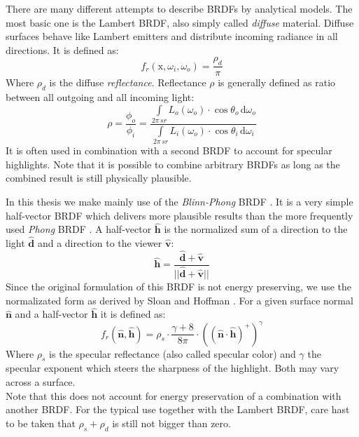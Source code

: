 \documentclass[thesis.tex]{subfiles}
\begin{document}
There are many different attempts to describe BRDFs by analytical models.
The most basic one is the Lambert BRDF, also simply called \emph{diffuse} material.
Diffuse surfaces behave like Lambert emitters and distribute incoming radiance in all directions.
It is defined as:
\begin{equation}
f_r(\mathrm{x}, \omega_i, \omega_o) = \frac{\rho_d}{\pi}
\end{equation}
Where $\rho_d$ is the diffuse \emph{reflectance}.
Reflectance $\rho$ is generally defined as ratio between all outgoing and all incoming light:
\begin{equation}
\rho = \frac{\phi_o}{\phi_i} = \frac{\int\limits_{2\pi\,sr} L_o(\omega_o)\cdot \cos\theta_o  \, \mathrm{d}\omega_o}{\int\limits_{2\pi\,sr} L_i(\omega_o)\cdot \cos\theta_i  \, \mathrm{d}\omega_i}
\end{equation}
It is often used in combination with a second BRDF to account for specular highlights.
Note that it is possible to combine arbitrary BRDFs as long as the combined result is still physically plausible.

In this thesis we make mainly use of the \emph{Blinn-Phong} BRDF \cite{bib:blinnphongbrdf}.
It is a very simple half-vector BRDF which delivers more plausible results than the more frequently used \emph{Phong} BRDF \cite[p.~251f]{bib:RealtimeRenderingBook}.
A half-vector $\hat{\mathbf{h}}$ is the normalized sum of a direction to the light $\hat{\mathbf{d}}$ and a direction to the viewer $\hat{\mathbf{v}}$:
\begin{equation}
\hat{\mathbf{h}} = \frac{\hat{\mathbf{d}} + \hat{\mathbf{v}}}{||\hat{\mathbf{d}} + \hat{\mathbf{v}}||}
\end{equation}
Since the original formulation of this BRDF is not energy preserving, we use the normalizated form as derived by Sloan and Hoffman \cite[p.~257]{bib:RealtimeRenderingBook}.
For a given surface normal $\hat{\mathbf{n}}$ and a half-vector $\hat{\mathbf{h}}$ it is defined as:
\begin{equation}
f_r(\hat{\mathbf{n}}, \hat{\mathbf{h}}) = \rho_s \cdot \frac{\gamma + 8}{8\pi} \cdot ((\hat{\mathbf{n}} \cdot \hat{\mathbf{h}})^+)^\gamma
\end{equation}
Where $\rho_s$ is the specular reflectance (also called specular color) and $\gamma$ the specular exponent which steers the sharpness of the highlight.
Both may vary across a surface.
\\
Note that this does not account for energy preservation of a combination with another BRDF.
For the typical use together with the Lambert BRDF, care hast to be taken that $\rho_s + \rho_d$ is still not bigger than zero.
\end{document}
